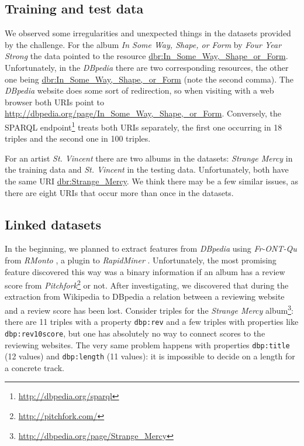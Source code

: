 \documentclass{llncs}
\begin{document}
\subsection{Training and test data}
We observed some irregularities and unexpected things in the datasets provided by the challenge.
For the album \emph{In Some Way, Shape, or Form} by \emph{Four Year Strong} the data pointed to the resource \url{dbr:In_Some_Way,_Shape_or_Form}.
Unfortunately, in the \emph{DBpedia} \cite{dbpedia} there are two corresponding resources, the other one being \url{dbr:In_Some_Way,_Shape,_or_Form} (note the second comma).
The \emph{DBpedia} website does some sort of redirection, so when visiting with a web browser both URIs point to \url{http://dbpedia.org/page/In_Some_Way,_Shape,_or_Form}.
Conversely, the SPARQL endpoint\footnote{\url{http://dbpedia.org/sparql}} treats both URIs separately, the first one occurring in 18 triples and the second one in 100 triples.

For an artist \emph{St. Vincent} there are two albums in the datasets: \emph{Strange Mercy} in the training data and \emph{St. Vincent} in the testing data.
Unfortunately, both have the same URI \url{dbr:Strange_Mercy}.
We think there may be a few similar issues, as there are eight URIs that occur more than once in the datasets.
%

\subsection{Linked datasets\label{sec:ld}}
In the beginning, we planned to extract features from \emph{DBpedia} using \emph{Fr-ONT-Qu} \cite{frontqu} from \emph{RMonto} \cite{rmonto}, a plugin to \emph{RapidMiner} \cite{rapidminer}.
Unfortunately, the most promising feature discovered this way was a binary information if an album has a review score from \emph{Pitchfork}\footnote{\url{http://pitchfork.com/}} or not.
After investigating, we discovered that during the extraction from Wikipedia to DBpedia a relation between a reviewing website and a review score has been lost.
Consider triples for the \emph{Strange Mercy} album\footnote{\url{http://dbpedia.org/page/Strange_Mercy}}: there are 11 triples with a property \texttt{dbp:rev} and a few triples with properties like \texttt{dbp:rev10score}, but one has absolutely no way to connect scores to the reviewing websites.
The very same problem happens with properties \texttt{dbp:title} (12 values) and \texttt{dbp:length} (11 values): it is impossible to decide on a length for a concrete track.
\end{document}
